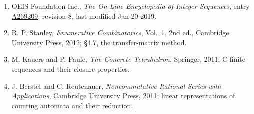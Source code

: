 \documentclass[11pt]{article}
\theoremstyle{definition}
\begin{document}
\begin{enumerate}

\item OEIS Foundation Inc., \emph{The On-Line Encyclopedia of Integer Sequences}, entry \href{https://oeis.org/A269209}{A269209}, revision 8, last modified Jan 20 2019.

\item R. P. Stanley, \emph{Enumerative Combinatorics}, Vol.~1, 2nd ed., Cambridge University Press, 2012; \S4.7, the transfer-matrix method.

\item M. Kauers and P. Paule, \emph{The Concrete Tetrahedron}, Springer, 2011; C-finite sequences and their closure properties.

\item J. Berstel and C. Reutenauer, \emph{Noncommutative Rational Series with Applications}, Cambridge University Press, 2011; linear representations of counting automata and their reduction.

\end{enumerate}
\end{document}
